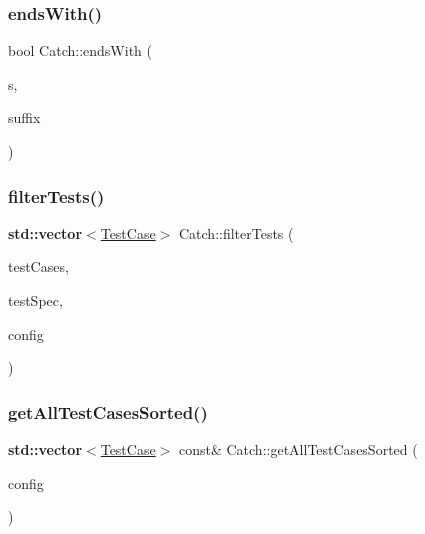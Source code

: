 \subsubsection{\texorpdfstring{ends\+With()}{endsWith()}\hspace{0.1cm}{\footnotesize\ttfamily [2/2]}}
{\footnotesize\ttfamily bool Catch\+::ends\+With (\begin{DoxyParamCaption}\item[{\textbf{ std\+::string} const \&}]{s,  }\item[{char}]{suffix }\end{DoxyParamCaption})}

\mbox{\label{namespace_catch_ab5da9aa67c42a3f626aea07d0b556829}} 
\subsubsection{\texorpdfstring{filter\+Tests()}{filterTests()}}
{\footnotesize\ttfamily \textbf{ std\+::vector}$<$\hyperlink{class_catch_1_1_test_case}{Test\+Case}$>$ Catch\+::filter\+Tests (\begin{DoxyParamCaption}\item[{\textbf{ std\+::vector}$<$ \hyperlink{class_catch_1_1_test_case}{Test\+Case} $>$ const \&}]{test\+Cases,  }\item[{Test\+Spec const \&}]{test\+Spec,  }\item[{I\+Config const \&}]{config }\end{DoxyParamCaption})}

\mbox{\label{namespace_catch_a1c9b1a23bc947ea70ddaabf067276cf2}} 
\subsubsection{\texorpdfstring{get\+All\+Test\+Cases\+Sorted()}{getAllTestCasesSorted()}}
{\footnotesize\ttfamily \textbf{ std\+::vector}$<$\hyperlink{class_catch_1_1_test_case}{Test\+Case}$>$ const\& Catch\+::get\+All\+Test\+Cases\+Sorted (\begin{DoxyParamCaption}\item[{I\+Config const \&}]{config }\end{DoxyParamCaption})}

